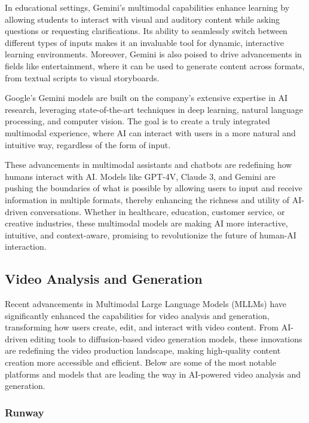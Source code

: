 In educational settings, Gemini's multimodal capabilities enhance learning by allowing students to interact with visual and auditory content while asking questions or requesting clarifications. 
Its ability to seamlessly switch between different types of inputs makes it an invaluable tool for dynamic, interactive learning environments. 
Moreover, Gemini is also poised to drive advancements in fields like entertainment, where it can be used to generate content across formats, from textual scripts to visual storyboards.

Google’s Gemini models are built on the company’s extensive expertise in AI research, leveraging state-of-the-art techniques in deep learning, natural language processing, and computer vision. 
The goal is to create a truly integrated multimodal experience, where AI can interact with users in a more natural and intuitive way, regardless of the form of input.

These advancements in multimodal assistants and chatbots are redefining how humans interact with AI. 
Models like GPT-4V, Claude 3, and Gemini are pushing the boundaries of what is possible by allowing users to input and receive information in multiple formats, thereby enhancing the richness and utility of AI-driven conversations. 
Whether in healthcare, education, customer service, or creative industries, these multimodal models are making AI more interactive, intuitive, and context-aware, promising to revolutionize the future of human-AI interaction.

\subsection{Video Analysis and Generation}

Recent advancements in Multimodal Large Language Models (MLLMs) have significantly enhanced the capabilities for video analysis and generation, transforming how users create, edit, and interact with video content. 
From AI-driven editing tools to diffusion-based video generation models, these innovations are redefining the video production landscape, making high-quality content creation more accessible and efficient. 
Below are some of the most notable platforms and models that are leading the way in AI-powered video analysis and generation.

\subsubsection{Runway}

